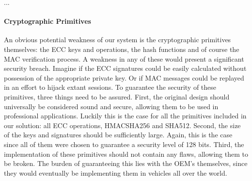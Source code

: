 ...


\paragraph{Cryptographic Primitives} An obvious potential weakness of our system is the cryptographic primitives themselves: the ECC keys and operations, the hash functions and of course the MAC verification process. A weakness in any of these would present a significant security breach. Imagine if the ECC signatures could be easily calculated without possession of the appropriate private key. Or if MAC messages could be replayed in an effort to hijack extant sessions. To guarantee the security of these primitives, three things need to be assured. First, the original design should universally be considered sound and secure, allowing them to be used in professional applications. Luckily this is the case for all the primitives included in our solution: all ECC operations, HMAC\textunderscore SHA256 and SHA512. Second, the size of the keys and signatures should be sufficiently large. Again, this is the case since all of them were chosen to guarantee a security level of 128 bits. Third, the implementation of these primitives should not contain any flaws, allowing them to be broken. The burden of guaranteeing this lies with the OEM's themselves, since they would eventually be implementing them in vehicles all over the world. 

